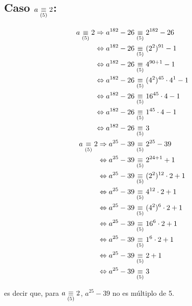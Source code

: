 \documentclass[a4paper,spanish]{article}
\begin{document}
  \subsection*{Caso $a \underset{(5)}\equiv 2$:}
  \begin{align*}
    a \underset{(5)}\equiv 2 \Rightarrow a^{182} - 26 &\underset{(5)}\equiv 2^{182} - 26              \\
                   \Leftrightarrow  a^{182} - 26 &\underset{(5)}\equiv (2^2)^{91}  - 1           \\
                   \Leftrightarrow  a^{182} - 26 &\underset{(5)}\equiv 4^{90 + 1}  - 1           \\
                   \Leftrightarrow  a^{182} - 26 &\underset{(5)}\equiv (4^2)^{45} \cdot 4^1  - 1 \\
                   \Leftrightarrow  a^{182} - 26 &\underset{(5)}\equiv 16^{45} \cdot 4  - 1      \\
                   \Leftrightarrow  a^{182} - 26 &\underset{(5)}\equiv 1^{45} \cdot 4  - 1       \\
                   \Leftrightarrow  a^{182} - 26 &\underset{(5)}\equiv 3                         \\
    a \underset{(5)}\equiv 2 \Rightarrow a^{25} - 39  &\underset{(5)}\equiv 2^{25} - 39               \\
                   \Leftrightarrow  a^{25} - 39  &\underset{(5)}\equiv 2^{24+1} + 1              \\
                   \Leftrightarrow  a^{25} - 39  &\underset{(5)}\equiv (2^2)^{12} \cdot 2 + 1    \\
                   \Leftrightarrow  a^{25} - 39  &\underset{(5)}\equiv 4^{12} \cdot 2 + 1        \\
                   \Leftrightarrow  a^{25} - 39  &\underset{(5)}\equiv (4^2)^{6} \cdot 2 + 1     \\
                   \Leftrightarrow  a^{25} - 39  &\underset{(5)}\equiv 16^{6} \cdot 2 + 1        \\
                   \Leftrightarrow  a^{25} - 39  &\underset{(5)}\equiv 1^{6} \cdot 2 + 1         \\
                   \Leftrightarrow  a^{25} - 39  &\underset{(5)}\equiv 2 + 1                     \\
                   \Leftrightarrow  a^{25} - 39  &\underset{(5)}\equiv 3
  \end{align*}

  es decir que, para $a \underset{(5)}\equiv 2$, $a^{25} - 39$ no es múltiplo de 5.
\end{document}
